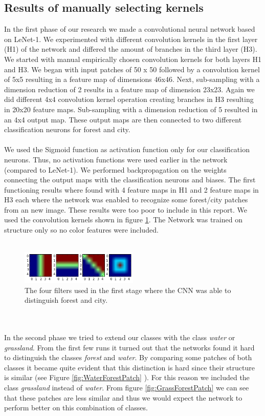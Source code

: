 \documentclass[a4paper,onecolumn]{report}
\begin{document}
\subsection{Results of manually selecting kernels}
In the first phase of our research we made a convolutional neural network based on LeNet-1. We experimented with different convolution kernels in the first layer (H1) of the network and differed the amount of branches in the third layer (H3). We started with manual empirically chosen convolution kernels for both layers H1 and H3. We began with input patches of 50 x 50 followed by a convolution kernel of 5x5 resulting in a feature map of dimensions 46x46. Next, sub-sampling with a dimension reduction of 2 results in a feature map of dimension 23x23. Again we did different 4x4 convolution kernel operation creating branches in H3 resulting in 20x20 feature maps. Sub-sampling with a dimension reduction of 5 resulted in an 4x4 output map. These output maps are then connected to two different classification neurons for forest and city. \\
\\
We used the Sigmoid function as activation function only for our classification neurons. Thus, no activation functions were used earlier in the network (compared to LeNet-1). We performed backpropagation on the weights connecting the output maps with the classification neurons and biases. The first functioning results where found with 4 feature maps in H1 and 2 feature maps in H3 each where the network was enabled to recognize some forest/city patches from an new image. These results were too poor to include in this report. We used the convolution kernels shown in figure \ref{fig:firstFilters}. The Network was trained on structure only so no color features were included. 
\\\\
\begin{figure}[h!]
	\centering
	\includegraphics[width=0.5\textwidth]{./images/firstFilters.png}
	\caption{The four filters used in the first stage where the CNN was able to distinguish forest and city.}
	\label{fig:firstFilters}
\end{figure} 
\\\\
In the second phase we tried to extend our classes with the class \textit{water} or \textit{grassland}. From the first few runs it turned out that the networks found it hard to distinguish the classes \textit{forest} and \textit{water}. By comparing some patches of both classes it became quite evident that this distinction is hard since their structure is similar (see Figure \ref{fig:WaterForestPatch} ). For this reason we included the class \textit{grassland} instead of \textit{water}. From figure \ref{fig:GrassForestPatch} we can see that these patches are less similar and thus we would expect the network to perform better on this combination of classes.
\end{document}
